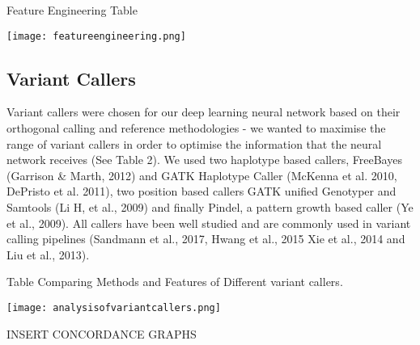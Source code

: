 \documentclass{article}
\begin{document}
\begin{table}[H]
\caption{Feature Engineering Table}
\texttt{[image: featureengineering.png]}
\centering
\end{table}
\subsection{Variant Callers}
Variant callers were chosen for our deep learning neural network based on their orthogonal calling and reference methodologies - we wanted to maximise the range of variant callers in order to optimise the information that the neural network receives (See Table 2). We used two haplotype based callers, FreeBayes (Garrison \& Marth, 2012) and GATK Haplotype Caller (McKenna et al. 2010, DePristo et al. 2011), two position based callers GATK unified Genotyper and Samtools (Li H, et al., 2009) and finally Pindel, a pattern growth based caller (Ye et al., 2009). All callers have been well studied and are commonly used in variant calling pipelines (Sandmann et al., 2017, Hwang et al., 2015 Xie et al., 2014 and Liu et al., 2013). 

\begin{table}[H]
\caption{Table Comparing Methods and Features of Different variant callers.}
\texttt{[image: analysisofvariantcallers.png]}
\centering
\end{table}

INSERT CONCORDANCE GRAPHS
\end{document}
